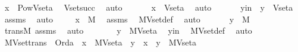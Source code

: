 \begin{isabellebody}
\ {\isachardoublequoteopen}x\ {\isasymin}\ Pow{\isacharparenleft}{\kern0pt}Vset{\isacharparenleft}{\kern0pt}a{\isacharparenright}{\kern0pt}{\isacharparenright}{\kern0pt}{\isachardoublequoteclose}\ \isamarkupfalse%
\ Vset{\isacharunderscore}{\kern0pt}succ\ \isamarkupfalse%
\ auto\ \isanewline
\ \ \isamarkupfalse%
\ \isamarkupfalse%
\ {\isachardoublequoteopen}x\ {\isasymsubseteq}\ Vset{\isacharparenleft}{\kern0pt}a{\isacharparenright}{\kern0pt}{\isachardoublequoteclose}\ \isamarkupfalse%
\ auto\ \isanewline
\ \ \isamarkupfalse%
\ \isamarkupfalse%
\ yin\ {\isacharcolon}{\kern0pt}\ {\isachardoublequoteopen}y\ {\isasymin}\ Vset{\isacharparenleft}{\kern0pt}a{\isacharparenright}{\kern0pt}{\isachardoublequoteclose}\ \isamarkupfalse%
\ assms\ \isamarkupfalse%
\ auto\ \isanewline
\ \ \isamarkupfalse%
\ {\isachardoublequoteopen}x\ {\isasymin}\ M{\isachardoublequoteclose}\ \isamarkupfalse%
\ assms\ \isamarkupfalse%
\ MVset{\isacharunderscore}{\kern0pt}def\ \isamarkupfalse%
\ auto\ \isanewline
\ \ \isamarkupfalse%
\ \isamarkupfalse%
\ {\isachardoublequoteopen}y\ {\isasymin}\ M{\isachardoublequoteclose}\ \isamarkupfalse%
\ transM\ assms\ \isamarkupfalse%
\ auto\ \isanewline
\ \ \isamarkupfalse%
\ \isamarkupfalse%
\ {\isachardoublequoteopen}\ y\ {\isasymin}\ MVset{\isacharparenleft}{\kern0pt}a{\isacharparenright}{\kern0pt}{\isachardoublequoteclose}\ \isamarkupfalse%
\ yin\ \isamarkupfalse%
\ MVset{\isacharunderscore}{\kern0pt}def\ \isamarkupfalse%
\ auto\ \isanewline
{}\isamarkupfalse%
%
\endisatagproof
{\isafoldproof}%
%
\isadelimproof
\ \isanewline
%
\endisadelimproof
\isanewline
{}\isamarkupfalse%
\ MVset{\isacharunderscore}{\kern0pt}trans\ {\isacharcolon}{\kern0pt}\ {\isachardoublequoteopen}Ord{\isacharparenleft}{\kern0pt}a{\isacharparenright}{\kern0pt}\ {\isasymLongrightarrow}\ x\ {\isasymin}\ MVset{\isacharparenleft}{\kern0pt}a{\isacharparenright}{\kern0pt}\ {\isasymLongrightarrow}\ y\ {\isasymin}\ x\ {\isasymLongrightarrow}\ y\ {\isasymin}\ MVset{\isacharparenleft}{\kern0pt}a{\isacharparenright}{\kern0pt}{\isachardoublequoteclose}\ \isanewline
%
\isadelimproof
%
\endisadelimproof
%
\isatagproof
{}\isamarkupfalse%
\ {\isacharminus}{\kern0pt}\ \isanewline

\end{isabellebody}
